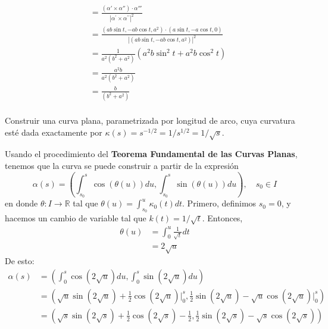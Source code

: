 \begin{problema}
\begin{sol}
\begin{itemize}
\begin{align*}
            &=\frac{(\alpha' \times  \alpha'')\cdot \alpha'''}{\left|\alpha^{\prime} \times \alpha^{\prime \prime}\right|^{2}}\\
            &= \frac{\left(ab\sin t, -ab\cos t, a^2\right)\cdot(a \sin t, -a \cos t, 0) }{|\left(ab\sin t, -ab\cos t, a^2\right)|^2}\\
            &= \frac{1}{a^2(b^2+a^2)}(a^2b\sin^2t +a^2b\cos^2t )\\
            &= \frac{a^2b}{a^2(b^2+a^2)}\\
            &= \frac{b}{(b^2+a^2)}\\
        \end{align*}
    \end{itemize}
\end{sol}
\end{problema}
\begin{problema}
     Construir una curva plana, parametrizada por longitud de arco, cuya curvatura esté dada exactamente por $\kappa(s)=s^{-1 / 2}=1/s^{1/2}=1/\sqrt{s}$.
    \begin{sol}
        Usando el procedimiento del \textbf{Teorema Fundamental de las Curvas Planas}, tenemos que la curva se puede construir a partir de la expresión 
        $$\alpha(s)=\left(\int_{s_0}^{s}\cos(\theta(u))du,\int_{s_0}^{s}\sin(\theta(u))du\right), \quad s_0\in I$$
        en donde $\theta: I\to\mathbb{R}$ tal que $\theta(u)=\int_{s_0}^{u}\kappa_0(t)dt$. Primero, definimos $s_0=0$, y hacemos un cambio de variable tal que $k(t)=1/\sqrt{t}$. Entonces, 
        \begin{align*}
            \theta(u)&=\int_{0}^{u}\frac{1}{\sqrt{t}}dt\\
            &= 2\sqrt{u}
        \end{align*}
        De esto: 
        \begin{align*}
            \alpha(s)&=\left(\int_{0}^{s}\cos(2\sqrt{u})du,\int_{0}^{s}\sin(2\sqrt{u})du\right)\\
            &= \left(\sqrt{u}\sin(2\sqrt{u})+\frac{1}{2}\cos (2\sqrt{u})\Big|_0^s,\frac{1}{2}\sin(2\sqrt{u})-\sqrt{u}\cos(2\sqrt{u})\Big|_0^s\right)\\
            &= \left(\sqrt{s}\sin(2\sqrt{s})+\frac{1}{2}\cos (2\sqrt{s})-\frac{1}{2},\frac{1}{2}\sin(2\sqrt{s})-\sqrt{s}\cos(2\sqrt{s})\right)\\
        \end{align*}


       
    \end{sol}
\end{problema}

%
%

